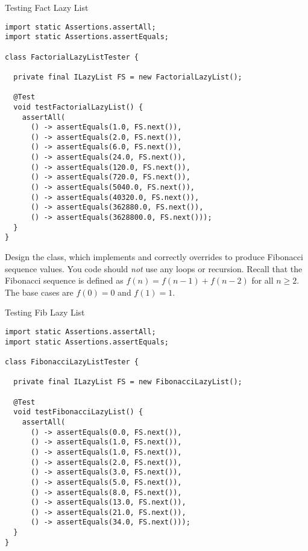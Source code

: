 \begin{cl}{Testing Fact Lazy List}
\begin{lstlisting}[language=MyJava]
import static Assertions.assertAll;
import static Assertions.assertEquals;

class FactorialLazyListTester {

  private final ILazyList FS = new FactorialLazyList();

  @Test
  void testFactorialLazyList() {
    assertAll(
      () -> assertEquals(1.0, FS.next()),
      () -> assertEquals(2.0, FS.next()),
      () -> assertEquals(6.0, FS.next()),
      () -> assertEquals(24.0, FS.next()),
      () -> assertEquals(120.0, FS.next()),
      () -> assertEquals(720.0, FS.next()),
      () -> assertEquals(5040.0, FS.next()),
      () -> assertEquals(40320.0, FS.next()),
      () -> assertEquals(362880.0, FS.next()),
      () -> assertEquals(3628800.0, FS.next()));
  }
}
\end{lstlisting}
\end{cl}

Design the  class, which implements  and correctly overrides  to produce Fibonacci sequence values. You code should \textit{not} use any loops or recursion. Recall that the Fibonacci sequence is defined as $f(n) = f(n - 1) + f(n - 2)$ for all $n\geq{2}$. The base cases are $f(0) = 0$ and $f(1) = 1$.

\begin{cl}{Testing Fib Lazy List}
\begin{lstlisting}[language=MyJava]
import static Assertions.assertAll;
import static Assertions.assertEquals;

class FibonacciLazyListTester {

  private final ILazyList FS = new FibonacciLazyList();

  @Test
  void testFibonacciLazyList() {
    assertAll(
      () -> assertEquals(0.0, FS.next()),
      () -> assertEquals(1.0, FS.next()),
      () -> assertEquals(1.0, FS.next()),
      () -> assertEquals(2.0, FS.next()),
      () -> assertEquals(3.0, FS.next()),
      () -> assertEquals(5.0, FS.next()),
      () -> assertEquals(8.0, FS.next()),
      () -> assertEquals(13.0, FS.next()),
      () -> assertEquals(21.0, FS.next()),
      () -> assertEquals(34.0, FS.next()));
  }
}
\end{lstlisting}
\end{cl}

